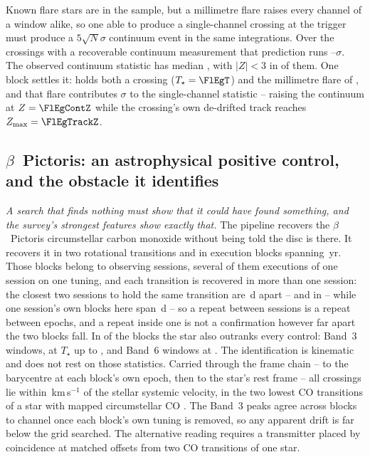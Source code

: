 Known flare stars are in the sample, but a millimetre flare raises every
channel of a window alike, so one able to produce a single-channel crossing at
the trigger must produce a $5\sqrt{N}\sigma$ continuum event in the same
integrations. Over the \FlNCont{} crossings with a recoverable continuum measurement
that prediction runs \FlPredLo--\FlPredHi$\sigma$. The observed continuum
statistic has median \FlObsMed, with $|Z|<3$ in \FlNQuiet{} of them. One block settles it: \FlEgStar{} \texttt{\FlEgEb} holds both a
crossing ($T_\star=\FlEgT$) and the millimetre flare of
\citet{MacGregor2020}, and that flare contributes \FlEgContrib$\sigma$
to the single-channel statistic -- raising the continuum at $Z=\FlEgContZ$
while the crossing's own de-drifted track reaches $Z_{\max}=\FlEgTrackZ$.

\subsection{$\beta$~Pictoris: an astrophysical positive control, and the
obstacle it identifies} \label{sec:bpicval}

\emph{A search that finds nothing must show that it could have found
something, and the survey's strongest features show exactly that.} The
pipeline recovers the $\beta$~Pictoris circumstellar carbon monoxide
without being told the disc is there. It recovers it in two
rotational transitions and in \CsBpCoBlocks{} execution
blocks spanning \BpBaselineYr\,yr. Those blocks belong to \CsBpCoSess{}
observing sessions, several of them executions of one session on one
tuning, and each transition is recovered in more than one session: the
closest two sessions to hold the same transition are \CsBpCoSepMinD\,d
apart -- \texttt{\NbSessEbOne} and \texttt{\NbSessEbTwo} in
\NbSessLine{} -- while one session's own blocks here span \QfBpSameSessD\,d
-- so a
repeat between sessions is a repeat between epochs, and a repeat inside one
is not a confirmation however far apart the two blocks fall.
In \NStageOneBpicEb{} of the blocks the star also outranks every control:
\BpicNFlagThree{} Band~3 windows, at $T_\star$ up to \BpicBThreeTsym, and
\BpicNFlagSix{} Band~6 windows at \BpicBSixTsym. The identification is kinematic and does not rest on those
statistics. Carried through the frame chain -- to the barycentre at each
block's own epoch, then to the star's rest frame -- all \BpicPanelNCo{}
crossings lie within \BpicDvCoHi\,km\,s$^{-1}$ of the stellar systemic
velocity, in the two lowest CO transitions of a star with mapped
circumstellar CO \citep{Dent2014,Matra2017}. The Band~3 peaks agree across blocks to
\BpRecThreeTuneChanMax{} channel once each block's own tuning is removed, so
any apparent drift is far below the grid searched. The alternative reading
requires a transmitter placed by coincidence at matched offsets from two CO
transitions of one star.

